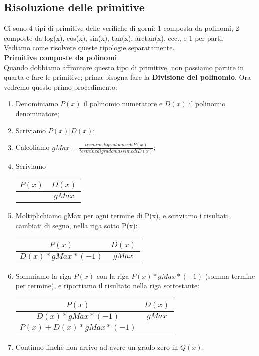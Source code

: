 \documentclass[11pt]{article}
\begin{document}
\subsection{Risoluzione delle primitive}
Ci sono 4 tipi di primitive delle verifiche di gorni: 1 composta da polinomi, 2 composte da log(x), cos(x), sin(x), tan(x), arctan(x), ecc., e 1 per parti.\\
Vediamo come risolvere queste tipologie separatamente.\\
\textbf{Primitive composte da polinomi}\\
Quando dobbiamo affrontare questo tipo di primitive, non possiamo partire in quarta e fare le primitive; prima bisogna fare la \textbf{Divisione del polinomio}. 
Ora vedremo questo primo procedimento:\\
\begin{enumerate}
    \item Denominiamo $P(x)$ il polinomio numeratore e $D(x)$ il polinomio denominatore;
    \item Scriviamo $P(x) | D(x)$;
    \item Calcoliamo $gMax = \frac{termine di grado max di P(x)}{termine di grado massimo di D(x)}$;
    \item Scriviamo
    \begin{tabular}{c|c}
        $P(x)$ & $D(x)$\\
        \hline
               & $gMax$
    \end{tabular}
    \item Moltiplichiamo gMax per ogni termine di P(x), e scriviamo i risultati, cambiati di segno, nella riga sotto P(x):\\
    \begin{tabular}{c|c}
        $P(x)$ & $D(x)$\\
        \hline
        $D(x)*gMax*(-1)$ & $gMax$
    \end{tabular}
    \item Sommiamo la riga $P(x)$ con la riga $P(x)*gMax*(-1)$ (somma termine per termine), e riportiamo il risultato nella riga sottostante:\\
    \begin{tabular}{c|c}
        $P(x)$ & $D(x)$\\
        \hline
        $D(x)*gMax*(-1)$ & $gMax$\\
        \hline
        $P(x) + D(x)*gMax*(-1)$
    \end{tabular}
    \item Continuo finchè non arrivo ad avere un grado zero in $Q(x)$:\\

\end{enumerate}
\end{document}

